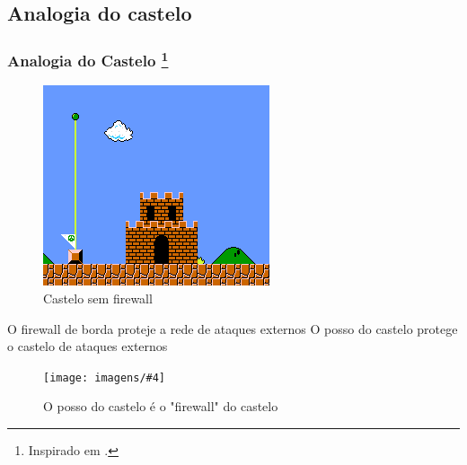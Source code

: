 





\subsection{Analogia do castelo}

\begin{frame}
	\frametitle{Analogia do Castelo \footnote{Inspirado em \cite{talal}.}}

	\begin{figure}
		\centering
		\includegraphics[height=.75\textheight]{imagens/castelo-mario.png}
		\caption{Castelo sem firewall}
	\end{figure}

\end{frame}

\newcommand{\analogia}[5][height=.5\textheight]{
	\begin{frame}
	\begin{block}{#2}
		#3
		\begin{figure}
			\centering
			\texttt{[image: imagens/\#4]}
			\caption{#5}
		\end{figure}
	\end{block}
	\end{frame}
}
\analogia	{O firewall de borda proteje a rede de ataques externos}
		{O posso do castelo protege o castelo de ataques externos}
		{castelo.jpg}
		{O posso do castelo é o "firewall" do castelo}

